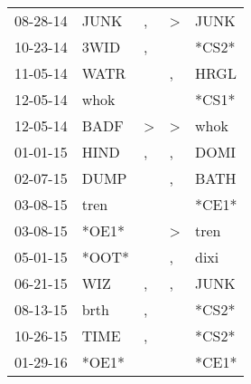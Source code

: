 \begin{supertabular}{p{0.07\textwidth}p{0.06\textwidth}p{0.02\textwidth}p{0.02\textwidth}p{0.06\textwidth}}
          08-28-14\textsuperscript{} &           JUNK\textsuperscript{} &                , &     \textgreater &           JUNK\textsuperscript{} \\
          10-23-14\textsuperscript{} &           3WID\textsuperscript{} &                , &                  &                            *CS2* \\
          11-05-14\textsuperscript{} &           WATR\textsuperscript{} &                  &                , &           HRGL\textsuperscript{} \\
          12-05-14\textsuperscript{} &           whok\textsuperscript{} &                  &                  &                            *CS1* \\
          12-05-14\textsuperscript{} &           BADF\textsuperscript{} &     \textgreater &     \textgreater &           whok\textsuperscript{} \\
          01-01-15\textsuperscript{} &           HIND\textsuperscript{} &                , &                , &           DOMI\textsuperscript{} \\
          02-07-15\textsuperscript{} &           DUMP\textsuperscript{} &                  &                , &           BATH\textsuperscript{} \\
          03-08-15\textsuperscript{} &           tren\textsuperscript{} &                  &                  &                            *CE1* \\
          03-08-15\textsuperscript{} &                            *OE1* &                  &     \textgreater &           tren\textsuperscript{} \\
          05-01-15\textsuperscript{} &                            *OOT* &                  &                , &           dixi\textsuperscript{} \\
          06-21-15\textsuperscript{} &            WIZ\textsuperscript{} &                , &                , &           JUNK\textsuperscript{} \\
          08-13-15\textsuperscript{} &           brth\textsuperscript{} &                , &                  &                            *CS2* \\
          10-26-15\textsuperscript{} &           TIME\textsuperscript{} &                , &                  &                            *CS2* \\
          01-29-16\textsuperscript{} &                            *OE1* &                  &                  &                            *CE1* \\

\end{supertabular}
